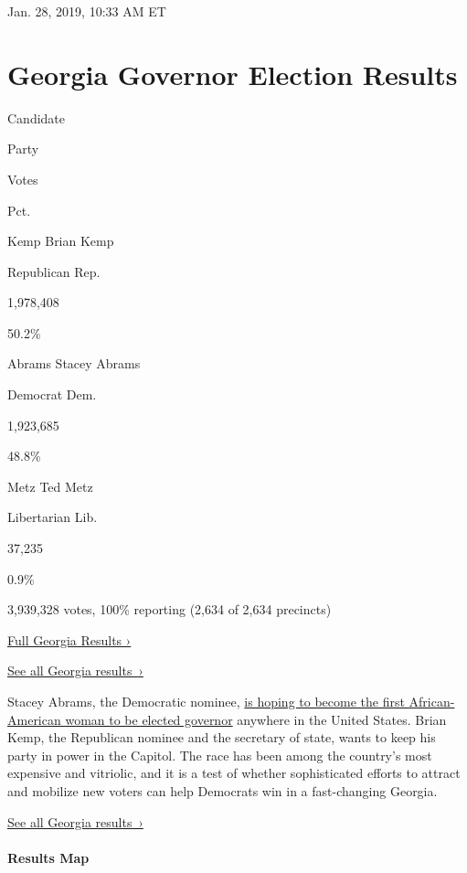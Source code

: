 Jan. 28, 2019, 10:33 AM ET

\hypertarget{georgia-governor-election-results}{%
\section{Georgia Governor Election
Results}\label{georgia-governor-election-results}}

Candidate

Party

Votes

Pct.

 Kemp Brian Kemp

Republican Rep.

1,978,408

50.2\%

 Abrams Stacey Abrams

Democrat Dem.

1,923,685

48.8\%

 Metz Ted Metz

Libertarian Lib.

37,235

0.9\%

3,939,328 votes, 100\% reporting (2,634 of 2,634 precincts)

\href{https://www.nytimes.com/interactive/2018/11/06/us/elections/results-georgia-elections.html}{Full
Georgia Results ›}

\href{https://www.nytimes.com/interactive/2018/11/06/us/elections/results-georgia-elections.html}{See
all Georgia results~›}

Stacey Abrams, the Democratic nominee,
\href{https://www.nytimes.com/2018/11/07/us/kemp-abrams-georgia-governor-elections.html}{is
hoping to become the first African-American woman to be elected
governor} anywhere in the United States. Brian Kemp, the Republican
nominee and the secretary of state, wants to keep his party in power in
the Capitol. The race has been among the country's most expensive and
vitriolic, and it is a test of whether sophisticated efforts to attract
and mobilize new voters can help Democrats win in a fast-changing
Georgia.

\href{https://www.nytimes.com/interactive/2018/11/06/us/elections/results-georgia-elections.html}{See
all Georgia results~›}

\hypertarget{results-map}{%
\paragraph{Results Map}\label{results-map}}

